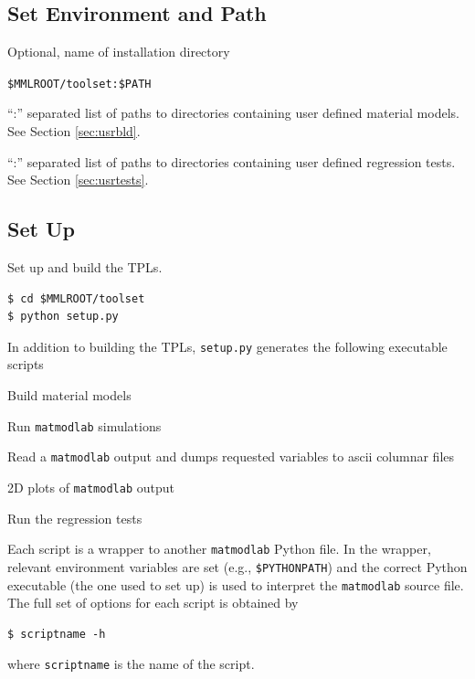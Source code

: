\documentclass[pdf,ps2pdf,12pt,report,strict]{SANDreport/SANDreport}
\newcommand{\mml}{\texttt{matmodlab}}
\begin{document}
\subsection{Set Environment and Path}

\begin{description}[leftmargin=!,labelwidth=\widthof{\texttt{MMLTESTS}}]
  \item[\texttt{MMLROOT}] Optional, name of installation directory
  \item[\texttt{PATH}] \verb|$MMLROOT/toolset:$PATH|
  \item[\texttt{MMLMTLS}] ``:'' separated list of paths to directories
  containing user defined material models. See Section \ref{sec:usrbld}.
  \item[\texttt{MMLTESTS}] ``:'' separated list of paths to directories
  containing user defined regression tests. See Section \ref{sec:usrtests}.
\end{description}

\subsection{Set Up}
Set up and build the TPLs.
%
\begin{verbatim}
$ cd $MMLROOT/toolset
$ python setup.py
\end{verbatim}
%
In addition to building the TPLs, \texttt{setup.py} generates the following
executable scripts
%
\begin{description}[leftmargin=!,labelwidth=\widthof{\texttt{buildmtls}}]
  \item[\texttt{buildmtls}] Build material models
  \item[\texttt{mml}] Run \mml{} simulations
  \item[\texttt{exdump}] Read a \mml{} output and dumps requested variables
  to ascii columnar files
  \item[\texttt{mmv}] 2D plots of \mml{} output
  \item[\texttt{runtests}] Run the regression tests
\end{description}
%
Each script is a wrapper to another \mml{} Python file. In the wrapper,
relevant environment variables are set (e.g., \verb|$PYTHONPATH|) and the
correct Python executable (the one used to set up) is used to interpret the
\mml{} source file.  The full set of options for each script is obtained by
%
\begin{verbatim}
$ scriptname -h
\end{verbatim}
%
where \texttt{scriptname} is the name of the script.
\end{document}
